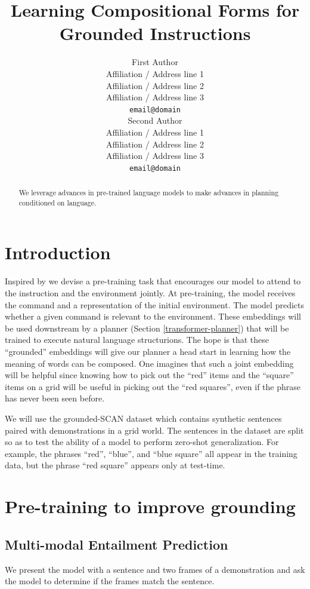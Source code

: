 \documentclass[11pt]{article}
\title{Learning Compositional Forms for Grounded Instructions}
\author{First Author \\
  Affiliation / Address line 1 \\
  Affiliation / Address line 2 \\
  Affiliation / Address line 3 \\
  \texttt{email@domain} \\\And
  Second Author \\
  Affiliation / Address line 1 \\
  Affiliation / Address line 2 \\
  Affiliation / Address line 3 \\
  \texttt{email@domain} \\}
\begin{document}
\maketitle
\begin{abstract}
We leverage advances in pre-trained language models to make advances in planning conditioned on language.
\end{abstract}

\section{Introduction}
Inspired by \cite{Lu2019ViLBERTPT} we devise a pre-training task that encourages our model to attend to the instruction and the environment jointly. 
%
At pre-training, the model receives the command and a representation of the initial environment. 
%
The model predicts whether a given command is relevant to the environment.
%
These embeddings will be used downstream by a planner (Section \ref{transformer-planner}) that will be trained to execute natural language structurions.
%
The hope is that these ``grounded'' embeddings will give our planner a head start in learning how the meaning of words can be composed.
%
One imagines that such a joint embedding will be helpful since knowing how to pick out the ``red'' items and the ``square''  items on a grid will be useful in picking out the ``red squares'', even if the phrase has never been seen before.

We will use the grounded-SCAN dataset \cite{ruis2020benchmark} which contains synthetic sentences paired with demonstrations in a grid world.
%
The sentences in the dataset are split so as to test the ability of a model to perform zero-shot generalization.
%
For example, the phrases ``red'', ``blue'', and ``blue square'' all appear in the training data, but the phrase ``red square'' appears only at test-time.

\section{Pre-training to improve grounding}

\subsection*{Multi-modal Entailment Prediction}
%
We present the model with a sentence and two frames of a demonstration and ask the model to determine if the frames match the sentence.
\end{document}
